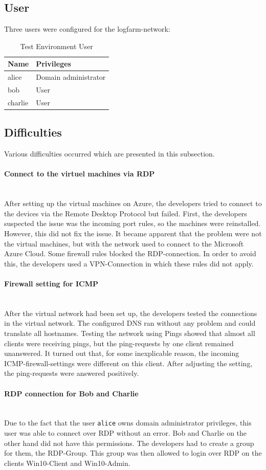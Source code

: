 \subsection{User}
Three users were configured for the logfarm-network:
\begin{table}[H]
    \centering
    \begin{tabular}{p{4cm} p{8cm}} \hline
        \textbf{Name} & \textbf{Privileges}  \\ \hline
        alice & Domain administrator  \\ \hline
        bob & User  \\ \hline
        charlie & User  \\ \hline
    \end{tabular}
    \caption{Test Environment User}
\end{table}

\subsection{Difficulties}
Various difficulties occurred which are presented in this subsection.
\paragraph{Connect to the virtuel machines via RDP} \ \\
After setting up the virtual machines on Azure, the developers tried to connect to the devices via the Remote Desktop Protocol but failed. First, the developers suspected the issue was the incoming port rules, so the machines were reinstalled. However, this did not fix the issue. It became apparent that the problem were not the virtual machines, but with the network used to connect to the Microsoft Azure Cloud. Some firewall rules blocked the RDP-connection. In order to avoid this, the developers used a VPN-Connection in which these rules did not apply.
\paragraph{Firewall setting for ICMP}\ \\
After the virtual network had been set up, the developers tested the connections in the virtual network. The configured DNS ran without any problem and could translate all hostnames. Testing the network using Pings showed that almost all clients were receiving pings, but the ping-requests by one client remained unanswered. It turned out that, for some inexplicable reason, the incoming ICMP-firewall-settings were different on this client. After adjusting the setting, the ping-requests were answered positively.

\paragraph{RDP connection for Bob and Charlie}\ \\
Due to the fact that the user \lstinline|alice| owns domain administrator privileges, this user was able to connect over RDP without an error. Bob and Charlie on the other hand did not have this permissions. The developers had to create a group for them, the RDP-Group. This group was then allowed to login over RDP on the clients Win10-Client and Win10-Admin. 